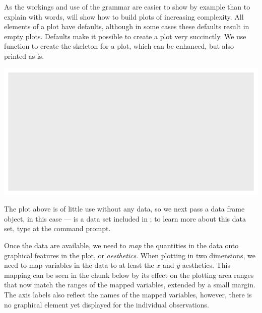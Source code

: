 \documentclass[krantz2]{krantz}\usepackage{knitr}
\begin{document}
As the workings and use of the grammar are easier to show by example than to explain with words, will show how to build plots of increasing complexity. All elements of a plot have defaults, although in some cases these defaults result in empty plots. Defaults make it possible to create a plot very succinctly. We use function  to create the skeleton for a plot, which can be enhanced, but also printed as is.

\begin{knitrout}\footnotesize
{}\color{fgcolor}\begin{kframe}
\begin{alltt}
\hlstd{()}
\end{alltt}
\end{kframe}

{\centering \includegraphics[width=.7\textwidth]{figure/pos-ggplot-basics-01-1} 

}



\end{knitrout}

The plot above is of little use without any data, so we next pass a data frame object, in this case --- is a data set included in \Rlang; to learn more about this data set, type  at the \Rlang command prompt.

\begin{knitrout}\footnotesize
{}\color{fgcolor}\begin{kframe}
\begin{alltt}
\hlstd{(} 
\end{alltt}
\end{kframe}
\end{knitrout}

Once the data are available, we need to \emph{map} the quantities in the data onto graphical features in the plot, or \emph{aesthetics}. When plotting in two dimensions, we need to map variables in the data to at least the $x$ and $y$ aesthetics. This mapping can be seen in the chunk below by its effect on the plotting area ranges that now match the ranges of the mapped variables, extended by a small margin. The axis labels also reflect the names of the mapped variables, however, there is no graphical element yet displayed for the individual observations.
\end{document}
